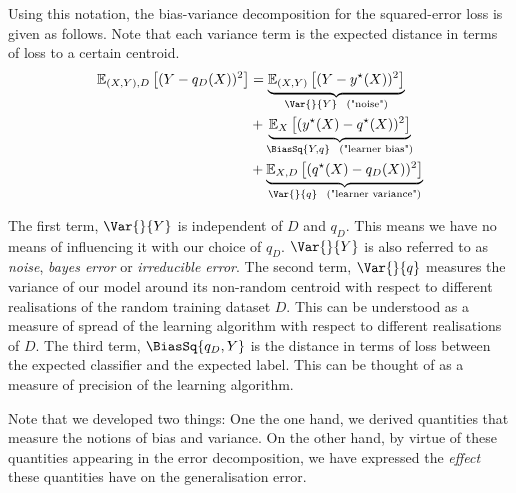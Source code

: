 \documentclass[
    a4paper, %
	fontsize=10pt, %
	twoside=false, %
]{kaobook}
\begin{document}
\begin{titlepage}
Using this notation, the bias-variance decomposition for the squared-error loss is given as follows.
Note that each variance term is the expected distance in terms of loss to a certain centroid.
\begin{align} \label{thm:sqerr-bias-variance-decomp}
\mathbb{E}_{(X,Y), D}\left[ (Y-q_{D}(X))^2 \right]  
&= \underbrace{\mathbb{E}_{(X,Y)}\left[ (Y-y^\star(X))^2 \right]   }_{\Var{}{Y} ~~ \text{("noise")}} \\
&+ \underbrace{ \mathbb{E}_{X}\left[  (y^\star(X) - q^\star(X))^2\right]  }_{\BiasSq{Y, q} ~~ \text{("learner bias")}} \\
&+ \underbrace{\mathbb{E}_{X, D}\left[ (q^\star(X) - q_{D}(X))^2 \right]   }_{\Var{}{q} ~~ \text{("learner variance")}}
\end{align}

The first term, $\Var{}{Y}$ is independent of $D$ and $q_{D}$. This means we have no means of influencing it with our choice of $q_{D}$.
$\Var{}{Y}$ is also referred to as \textit{noise}, \textit{bayes error} or \textit{irreducible error}. 
The second term, $\Var{}{q}$ measures the variance of our model around its non-random centroid with respect to different realisations of the random training dataset $D$. This can be understood as a measure of spread of the learning algorithm with respect to different realisations of $D$.
The third term, $\BiasSq{q_{D}, Y}$ is the distance in terms of loss between the expected classifier and the expected label. This can be thought of as a measure of precision of the learning algorithm. 

Note that we developed two things:
One the one hand, we derived quantities that measure the notions of bias and variance. On the other hand, by virtue of these quantities appearing in the error decomposition, we have expressed the \textit{effect} these quantities have on the generalisation error.


\end{titlepage}
\end{document}
